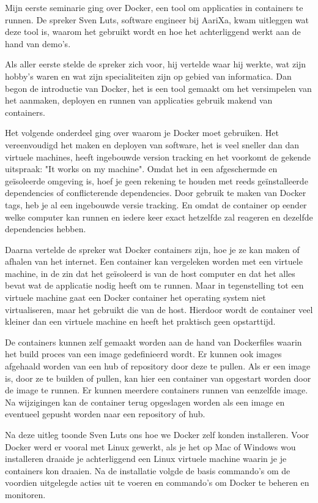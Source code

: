 
Mijn eerste seminarie ging over Docker, een tool om applicaties in containers te runnen. De spreker Sven Luts, software engineer bij AariXa, kwam uitleggen wat deze tool is, waarom het gebruikt wordt en hoe het achterliggend werkt aan de hand van demo's.

Als aller eerste stelde de spreker zich voor, hij vertelde waar hij werkte, wat zijn hobby's waren en wat zijn specialiteiten zijn op gebied van informatica. Dan begon de introductie van Docker, het is een tool gemaakt om het versimpelen van het aanmaken, deployen en runnen van applicaties gebruik makend van containers.

Het volgende onderdeel ging over waarom je Docker moet gebruiken. Het vereenvoudigd het maken en deployen van software, het is veel sneller dan dan virtuele machines, heeft ingebouwde version tracking en het voorkomt de gekende uitspraak: "It works on my machine". Omdat het in een afgeschermde en geïsoleerde omgeving is, hoef je geen rekening te houden met reeds geïnstalleerde dependencies of conflicterende dependencies. Door gebruik te maken van Docker tags, heb je al een ingebouwde versie tracking. En omdat de container op eender welke computer kan runnen en iedere keer exact hetzelfde zal reageren en dezelfde dependencies hebben.

Daarna vertelde de spreker wat Docker containers zijn, hoe je ze kan maken of afhalen van het internet. Een container kan vergeleken worden met een virtuele machine, in de zin dat het ge\"isoleerd is van de host computer en dat het alles bevat wat de applicatie nodig heeft om te runnen. Maar in tegenstelling tot een virtuele machine gaat een Docker container het operating system niet virtualiseren, maar het gebruikt die van de host. Hierdoor wordt de container veel kleiner dan een virtuele machine en heeft het praktisch geen opstarttijd.

De containers kunnen zelf gemaakt worden aan de hand van Dockerfiles waarin het build proces van een image gedefinieerd wordt. Er kunnen ook images afgehaald worden van een hub of repository door deze te pullen. Als er een image is, door ze te builden of pullen, kan hier een container van opgestart worden door de image te runnen. Er kunnen meerdere containers runnen van eenzelfde image. Na wijzigingen kan de container terug opgeslagen worden als een image en eventueel gepusht worden naar een repository of hub.

Na deze uitleg toonde Sven Luts ons hoe we Docker zelf konden installeren. Voor Docker werd er vooral met Linux gewerkt, als je het op Mac of Windows wou installeren draaide je achterliggend een Linux virtuele machine waarin je je containers kon draaien. Na de installatie volgde de basis commando's om de voordien uitgelegde acties uit te voeren en commando's om Docker te beheren en monitoren.

